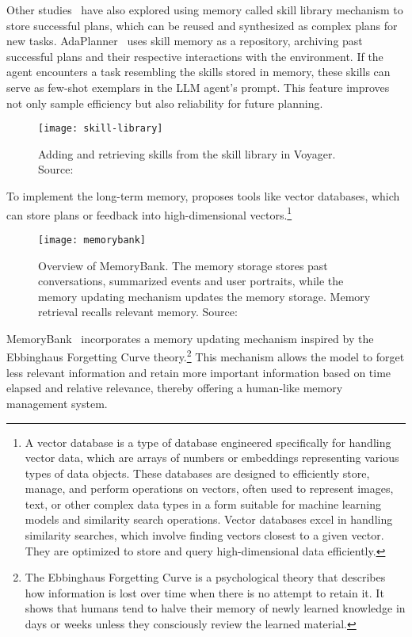 Other studies~\cite{sun2023adaplanner, wang2023voyager} have also explored using memory called skill library mechanism to store successful plans, which can be reused and synthesized as complex plans for new tasks.
AdaPlanner~\cite{sun2023adaplanner} uses skill memory as a repository, archiving past successful plans and their respective interactions with the environment.
If the agent encounters a task resembling the skills stored in memory, these skills can serve as few-shot exemplars in the LLM agent’s prompt.
This feature improves not only sample efficiency but also reliability for future planning.
\begin{figure}[h!]
	\centering
	\texttt{[image: skill-library]}
	\caption{Adding and retrieving skills from the skill library in Voyager. Source: \textcite{sun2023adaplanner}}
	\label{fig:skill-library}
\end{figure}
To implement the long-term memory, \textcite{wang2023voyager, wang2021milvus} proposes tools like vector databases, which can store plans or feedback into high-dimensional vectors.\footnote{A vector database is a type of database engineered specifically for handling vector data, which are arrays of numbers or embeddings representing various types of data objects.
	These databases are designed to efficiently store, manage, and perform operations on vectors, often used to represent images, text, or other complex data types in a form suitable for machine learning models and similarity search operations.
	Vector databases excel in handling similarity searches, which involve finding vectors closest to a given vector.
	They are optimized to store and query high-dimensional data efficiently.}
\begin{figure}[h!]
	\centering
	\texttt{[image: memorybank]}
	\caption{Overview of MemoryBank. The memory storage stores past conversations, summarized events and user portraits, while the memory updating mechanism updates the memory storage. Memory retrieval recalls relevant memory. Source: \textcite{zhong2023memorybankenhancinglargelanguage}}
	\label{fig:memorybank}
\end{figure}
MemoryBank~\cite{zhong2023memorybankenhancinglargelanguage} incorporates a memory updating mechanism inspired by the Ebbinghaus Forgetting Curve theory.\footnote{The Ebbinghaus Forgetting Curve is a psychological theory that describes how information is lost over time when there is no attempt to retain it.
	It shows that humans tend to halve their memory of newly learned knowledge in days or weeks unless they consciously review the learned material.}
This mechanism allows the model to forget less relevant information and retain more important information based on time elapsed and relative relevance, thereby offering a human-like memory management system.


